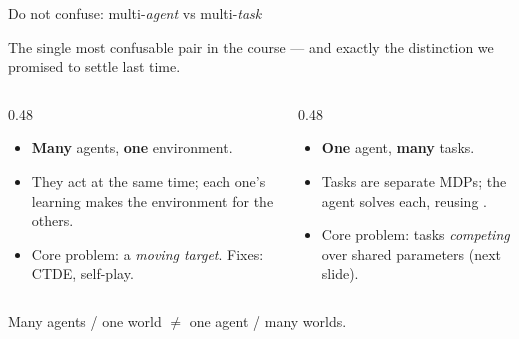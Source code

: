 \begin{frame}{Do not confuse: multi-\emph{agent} vs multi-\emph{task}}
\begin{center}\footnotesize
The single most confusable pair in the course --- and exactly the distinction we
promised to settle last time.
\end{center}
\vspace{0.4em}
\begin{columns}[t]
\begin{column}{0.48\textwidth}
\begin{tcolorbox}[colback=boxred!30, colframe=accentred, title=\textbf{Multi-agent RL} \;(last time)]
\footnotesize
\begin{itemize}\itemsep0.3em
    \item \textbf{Many} agents, \textbf{one} environment.
    \item They act at the same time; each one's learning makes the environment
           for the others.
    \item Core problem: a \emph{moving target}. Fixes: CTDE, self-play.
\end{itemize}
\end{tcolorbox}
\end{column}
\begin{column}{0.48\textwidth}
\begin{tcolorbox}[colback=mlgreen!25, colframe=mlgreen!60!black, title=\textbf{Multi-task RL} \;(today)]
\footnotesize
\begin{itemize}\itemsep0.3em
    \item \textbf{One} agent, \textbf{many} tasks.
    \item Tasks are separate MDPs; the agent solves each, reusing
          .
    \item Core problem: tasks \emph{competing} over shared parameters (next slide).
\end{itemize}
\end{tcolorbox}
\end{column}
\end{columns}
\vfill
\begin{center}\footnotesize
Many agents / one world \; $\neq$ \; one agent / many worlds.
\end{center}
\end{frame}

